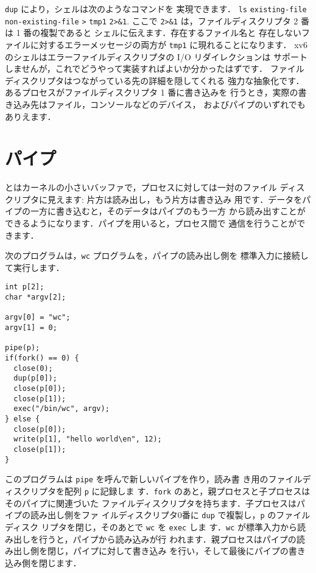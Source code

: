 \lstinline{dup} により，シェルは次のようなコマンドを
実現できます．
\lstinline{ls}
\lstinline{existing-file}
\lstinline{non-existing-file}
\lstinline{>}
\lstinline{tmp1}
\lstinline{2>&1}.
ここで
\lstinline{2>&1}
は，ファイルディスクリプタ 2 番は 1 番の複製であると
シェルに伝えます．存在するファイル名と
存在しないファイルに対するエラーメッセージの両方が
\lstinline{tmp1} に現れることになります．
xv6 のシェルはエラーファイルディスクリプタの I/O リダイレクションは
サポートしませんが，これでどうやって実装すればよいか分かったはずです．
ファイルディスクリプタはつながっている先の詳細を隠してくれる
強力な抽象化です．あるプロセスがファイルディスクリプタ 1 番に書き込みを
行うとき，実際の書き込み先はファイル，コンソールなどのデバイス，
およびパイプのいずれでもありえます．

\section{パイプ}

とはカーネルの小さいバッファで，プロセスに対しては一対のファイル
ディスクリプタに見えます: 片方は読み出し，もう片方は書き込み
用です．データをパイプの一方に書き込むと，そのデータはパイプのもう一方
から読み出すことができるようになります．パイプを用いると，プロセス間で
通信を行うことができます．


次のプログラムは，\lstinline{wc} プログラムを，パイプの読み出し側を
標準入力に接続して実行します．
\begin{lstlisting}[]
int p[2];
char *argv[2];

argv[0] = "wc";
argv[1] = 0;

pipe(p);
if(fork() == 0) {
  close(0);
  dup(p[0]);
  close(p[0]);
  close(p[1]);
  exec("/bin/wc", argv);
} else {
  close(p[0]);
  write(p[1], "hello world\en", 12);
  close(p[1]);
}
\end{lstlisting}
このプログラムは \lstinline{pipe} を呼んで新しいパイプを作り，読み書
き用のファイルディスクリプタを配列 \lstinline{p} に記録しま
す．\lstinline{fork} のあと，親プロセスと子プロセスはそのパイプに関連づいた
ファイルディスクリプタを持ちます．子プロセスはパイプの読み出し側をファ
イルディスクリプタ0番に \lstinline{dup} で複製し，\lstinline{p} のファイルディスク
リプタを閉じ，そのあとで \lstinline{wc} を \lstinline{exec} しま
す．\lstinline{wc} が標準入力から読み出しを行うと，パイプから読み込みが行
われます．親プロセスはパイプの読み出し側を閉じ，パイプに対して書き込み
を行い，そして最後にパイプの書き込み側を閉じます．


